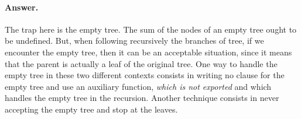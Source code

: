 \paragraph{Answer.}

The trap here is the empty tree. The sum of the nodes of an empty tree
ought to be undefined. But, when following recursively the
branches of tree, if we encounter the empty tree, then it can be an
acceptable situation, since it means that the parent is actually a
leaf of the original tree. One way to handle the empty tree in these
two different contexts consists in writing no clause for the empty
tree and use an auxiliary function, \emph{which is not exported} and
which handles the empty tree in the recursion. Another technique
consists in never accepting the empty tree and stop at the leaves.
{\small}
